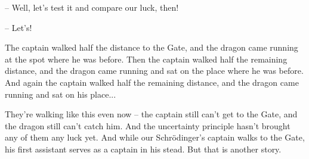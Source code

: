 \documentclass[ebook,oneside,final,openright]{memoir}
\begin{document}
– Well, let’s test it and compare our luck, then!\par
– Let’s!\par
\par
The captain walked half the distance to the Gate, and the dragon came running at the spot where he was before. Then the captain walked half the remaining distance, and the dragon came running and sat on the place where he was before. And again the captain walked half the remaining distance, and the dragon came running and sat on his place...\par
\par
They’re walking like this even now – the captain still can’t get to the Gate, and the dragon still can’t catch him. And the uncertainty principle hasn’t brought any of them any luck yet. And while our Schrödinger’s captain walks to the Gate, his first assistant serves as a captain in his stead. But that is another story.
\end{document}
